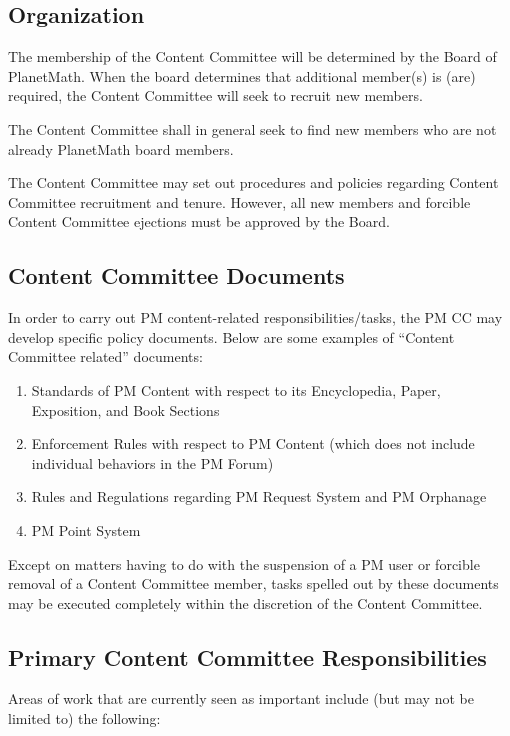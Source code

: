 \subsection*{Organization}

The membership of the Content Committee will be determined by the Board of PlanetMath. When the board determines that additional member(s) is (are) required, the Content Committee will seek to recruit new members.

The Content Committee shall in general seek to find new members who are not already PlanetMath board members.

The Content Committee may set out procedures and policies regarding Content Committee recruitment and tenure. However, all new members and forcible Content Committee ejections must be approved by the Board.

\subsection*{Content Committee Documents}

In order to carry out PM content-related responsibilities/tasks, the PM CC may develop specific policy documents. Below are some examples of ``Content Committee related'' documents:

\begin{enumerate}
\item Standards of PM Content with respect to its Encyclopedia, Paper, Exposition, and Book Sections
\item Enforcement Rules with respect to PM Content (which does not include individual behaviors in the PM Forum)
\item Rules and Regulations regarding PM Request System and PM Orphanage
\item PM Point System
\end{enumerate}

Except on matters having to do with the suspension of a PM user or forcible removal of a Content Committee member, tasks spelled out by these documents may be executed completely within the discretion of the Content Committee.

\subsection*{Primary Content Committee Responsibilities}

Areas of work that are currently seen as important include (but may not be limited to) the following:

